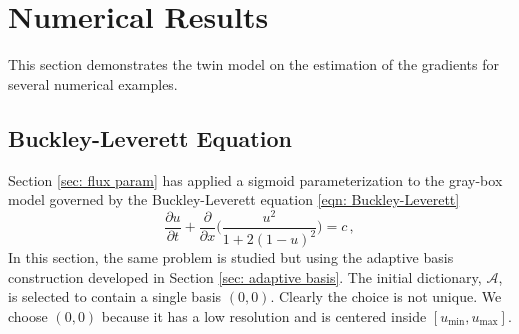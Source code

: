 %

\newpage
\section{Numerical Results}
\label{sec: twin numerical results}
This section demonstrates the twin model on the estimation of the gradients for
several numerical examples.


\subsection{Buckley-Leverett Equation}
\label{sec: chap 2 BL}
Section \ref{sec: flux param} has applied a sigmoid parameterization to the gray-box model
governed by the Buckley-Leverett equation \eqref{eqn: Buckley-Leverett}
\begin{equation*}
    \frac{\partial u}{\partial t} + \frac{\partial}{\partial x}\Big({
    \frac{u^2}{1+ 2(1-u)^2}} \Big) = c\,,
\end{equation*}
In this section, the same problem is studied but using the adaptive basis construction developed 
in Section \ref{sec: adaptive basis}. 
The initial dictionary, $\mathcal{A}$, is selected to contain a single basis
$\left(0, 0\right)$. Clearly the choice is not unique. 
We choose $\left(0, 0\right)$ because it has a low resolution 
and is centered inside $\left[u_{\min}, u_{\max}\right]$.\\

